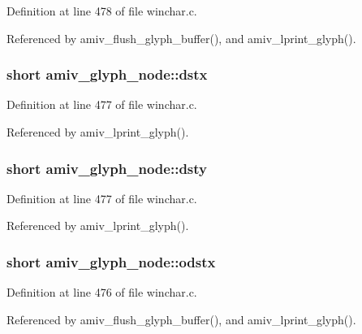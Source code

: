 Definition at line 478 of file winchar.\+c.



Referenced by amiv\+\_\+flush\+\_\+glyph\+\_\+buffer(), and amiv\+\_\+lprint\+\_\+glyph().

\hypertarget{structamiv__glyph__node_a42565a3c855ecf34f2cd47a3af3249b1}{
\subsubsection[{dstx}]{\setlength{\rightskip}{0pt plus 5cm}short amiv\+\_\+glyph\+\_\+node\+::dstx}}\label{structamiv__glyph__node_a42565a3c855ecf34f2cd47a3af3249b1}


Definition at line 477 of file winchar.\+c.



Referenced by amiv\+\_\+lprint\+\_\+glyph().

\hypertarget{structamiv__glyph__node_ada857f1baefdc0ec033c8380ee8b1a4f}{
\subsubsection[{dsty}]{\setlength{\rightskip}{0pt plus 5cm}short amiv\+\_\+glyph\+\_\+node\+::dsty}}\label{structamiv__glyph__node_ada857f1baefdc0ec033c8380ee8b1a4f}


Definition at line 477 of file winchar.\+c.



Referenced by amiv\+\_\+lprint\+\_\+glyph().

\hypertarget{structamiv__glyph__node_a01d08c786e450b313545f99bcc9b7cb9}{
\subsubsection[{odstx}]{\setlength{\rightskip}{0pt plus 5cm}short amiv\+\_\+glyph\+\_\+node\+::odstx}}\label{structamiv__glyph__node_a01d08c786e450b313545f99bcc9b7cb9}


Definition at line 476 of file winchar.\+c.



Referenced by amiv\+\_\+flush\+\_\+glyph\+\_\+buffer(), and amiv\+\_\+lprint\+\_\+glyph().

